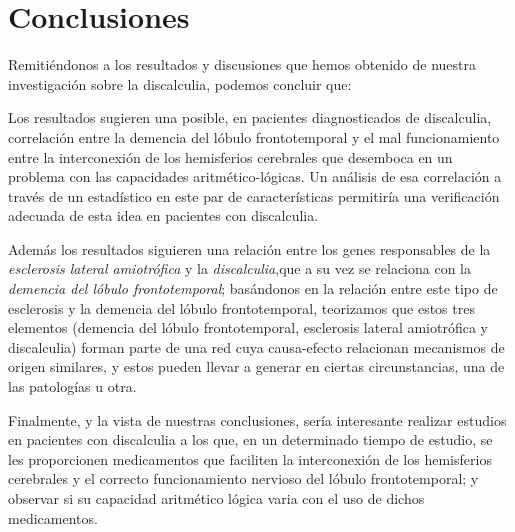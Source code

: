 \section{Conclusiones}

\hfill

Remitiéndonos a los resultados y discusiones que hemos obtenido de nuestra investigación sobre la discalculia, podemos concluir que:

\hfill

Los resultados sugieren una posible, en pacientes diagnosticados de discalculia, correlación entre la demencia del lóbulo frontotemporal y el mal funcionamiento entre la interconexión de los hemisferios cerebrales que desemboca en un problema con las capacidades aritmético-lógicas. Un análisis de esa correlación a través de un estadístico en este par de características permitiría una verificación adecuada de esta idea en pacientes con discalculia.

\hfill

Además los resultados siguieren una relación entre los genes responsables de la \textit{esclerosis lateral amiotrófica} y la \textit{discalculia},que a su vez se relaciona con la \textit{demencia del lóbulo frontotemporal}; basándonos en la relación entre este tipo de esclerosis y la demencia del lóbulo frontotemporal, teorizamos que estos tres elementos (demencia del lóbulo frontotemporal, esclerosis lateral amiotrófica y discalculia) forman parte de una red cuya causa-efecto relacionan mecanismos de origen similares, y estos pueden llevar a generar en ciertas circunstancias, una de las patologías u otra.

\hfill

Finalmente, y la vista de nuestras conclusiones, sería interesante realizar estudios en pacientes con discalculia a los que, en un determinado tiempo de estudio, se les proporcionen medicamentos que faciliten la interconexión de los hemisferios cerebrales y el correcto funcionamiento nervioso del lóbulo frontotemporal; y observar si su capacidad aritmético lógica varia con el uso de dichos medicamentos.


